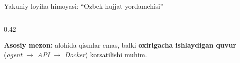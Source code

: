 \documentclass[aspectratio=169,11pt]{beamer}
\newcommand{\uzq}{\textquotesingle{}}   %
\begin{document}
\begin{frame}{Yakuniy loyiha himoyasi: ``O\uzq{}zbek hujjat yordamchisi''}
\begin{columns}[T,totalwidth=\textwidth]
\begin{column}{0.42\textwidth}
      \vspace{4pt}

      \begin{tcolorbox}[defbox,top=2pt,bottom=2pt,left=4pt,right=4pt]
        \footnotesize
        \textbf{Asosiy mezon:}
        alohida qismlar emas, balki
        \textbf{oxirigacha ishlaydigan quvur}
        (\textit{agent} $\rightarrow$ \textit{API} $\rightarrow$ \textit{Docker})
        ko\uzq{}rsatilishi muhim.
      \end{tcolorbox}
    \end{column}
  \end{columns}
\end{frame}

\end{document}
